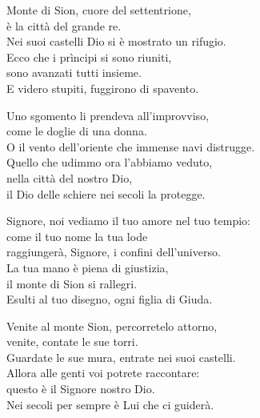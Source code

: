 

\spazio

\strofa Monte di Sion, cuore del settentrione,\\
è la città del grande re.\\
Nei suoi castelli Dio si è mostrato un rifugio.\\
Ecco che i prìncipi si sono riuniti,\\
sono avanzati tutti insieme.\\
E videro stupiti, fuggirono di spavento.

\spazio


\spazio

\strofa Uno sgomento li prendeva all'improvviso,\\
come le doglie di una donna.\\
O il vento dell'oriente che immense navi distrugge.\\
Quello che udimmo ora l'abbiamo veduto,\\
nella città del nostro Dio,\\
il Dio delle schiere nei secoli la protegge.

\spazio


\spazio

\strofa Signore, noi vediamo il tuo amore nel tuo tempio:\\
come il tuo nome la tua lode\\
raggiungerà, Signore, i confini dell'universo.\\
La tua mano è piena di giustizia,\\
il monte di Sion si rallegri.\\
Esulti al tuo disegno, ogni figlia di Giuda.

\spazio


\spazio

\strofa Venite al monte Sion, percorretelo attorno,\\
venite, contate le sue torri.\\
Guardate le sue mura, entrate nei suoi castelli.\\
Allora alle genti voi potrete raccontare:\\
questo è il Signore nostro Dio.\\
Nei secoli per sempre è Lui che ci guiderà.

\spazio

